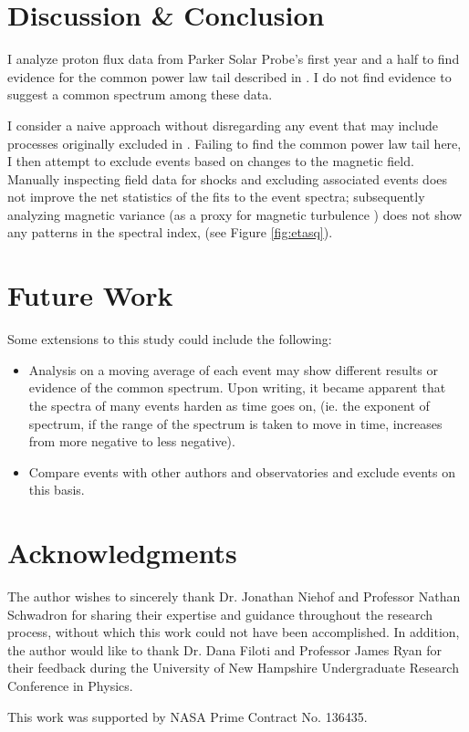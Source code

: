 \documentclass[letterpaper,11pt]{article}
\begin{document}
\section{Discussion \& Conclusion}
\label{sec:conclusion}
I analyze proton flux data from Parker Solar Probe's first year and a half to find evidence for the common power law tail described in \citet{Fisk2006}.  I do not find evidence to suggest a common spectrum among these data.

I consider a naive approach without disregarding any event that may include processes originally excluded in \citet{Fisk2006}.  Failing to find the common power law tail here, I then attempt to exclude events based on changes to the magnetic field.  Manually inspecting field data for shocks and excluding associated events does not improve the net statistics of the fits to the event spectra; subsequently analyzing magnetic variance (as a proxy for magnetic turbulence \citep{Schwadron1996}) does not show any patterns in the spectral index, (see Figure \ref{fig:etasq}).



\section{Future Work}
\label{sec:future}
Some extensions to this study could include the following:

\begin{itemize}
\item Analysis on a moving average of each event may show different results or evidence of the common spectrum.  Upon writing, it became apparent that the spectra of many events harden as time goes on, (ie. the exponent of spectrum, if the range of the spectrum is taken to move in time, increases from more negative to less negative).
\item Compare events with other authors and observatories and exclude events on this basis.
\end{itemize}



\section{Acknowledgments}
The author wishes to sincerely thank Dr. Jonathan Niehof and Professor Nathan Schwadron for sharing their expertise and guidance throughout the research process, without which this work could not have been accomplished. In addition, the author would like to thank Dr. Dana Filoti and Professor James Ryan for their feedback during the University of New Hampshire Undergraduate Research Conference in Physics.

\bigskip

\noindent This work was supported by NASA Prime Contract No. 136435.




%
%

\end{document}
